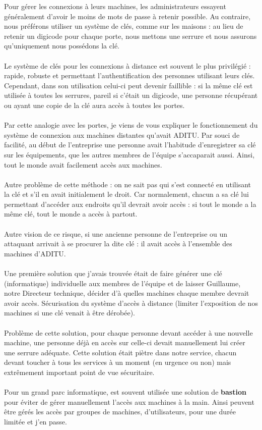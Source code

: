 \begin{sloppypar}
Pour gérer les connexions à leurs machines, les administrateurs essayent généralement d'avoir le moins de mots de passe à retenir possible. Au contraire, nous préférons utiliser un système de clés, comme sur les maisons : au lieu de retenir un digicode pour chaque porte, nous mettons une serrure et nous assurons qu'uniquement nous possédons la clé.
\\ \\
Le système de clés pour les connexions à distance est souvent le plus privilégié : rapide, robuste et permettant l'authentification des personnes utilisant leurs clés. Cependant, dans son utilisation celui-ci peut devenir faillible : si la même clé est utilisée à toutes les serrures, pareil si c'était un digicode, une personne récupérant ou ayant une copie de la clé aura accès à toutes les portes.
\\ \\
Par cette analogie avec les portes, je viens de vous expliquer le fonctionnement du système de connexion aux machines distantes qu'avait ADITU. Par souci de facilité, au début de l'entreprise une personne avait l'habitude d'enregistrer sa clé sur les équipements, que les autres membres de l'équipe s'accaparait aussi. Ainsi, tout le monde avait facilement accès aux machines.
\\ \\
Autre problème de cette méthode : on ne sait pas qui s'est connecté en utilisant la clé et s'il en avait initialement le droit. Car normalement, chacun a sa clé lui permettant d'accéder aux endroits qu'il devrait avoir accès : si tout le monde a la même clé, tout le monde a accès à partout.
\\ \\
Autre vision de ce risque, si une ancienne personne de l'entreprise ou un attaquant arrivait à se procurer la dite clé : il avait accès à l'ensemble des machines d'ADITU.
\\ \\
Une première solution que j'avais trouvée était de faire générer une clé (informatique) individuelle aux membres de l'équipe et de laisser Guillaume, notre Directeur technique, décider d'à quelles machines chaque membre devrait avoir accès. Sécurisation du système d'accès à distance (limiter l'exposition de nos machines si une clé venait à être dérobée).
\\ \\
Problème de cette solution, pour chaque personne devant accéder à une nouvelle machine, une personne déjà en accès sur celle-ci devait manuellement lui créer une serrure adéquate. Cette solution était piètre dans notre service, chacun devant toucher à tous les services à un moment (en urgence ou non) mais extrêmement important point de vue sécuritaire.
\\ \\
Pour un grand parc informatique, est souvent utilisée une solution de \textbf{bastion} pour éviter de gérer manuellement l'accès aux machines à la main. Ainsi peuvent être gérés les accès par groupes de machines, d'utilisateurs, pour une durée limitée et j'en passe. 


\end{sloppypar}

